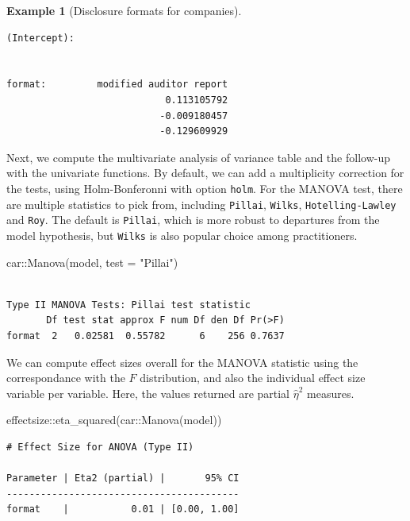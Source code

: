 \documentclass[
  11pt,
  letterpaper,
]{scrbook}
\newenvironment{Shaded}{\begin{snugshade}}{\end{snugshade}}
\newcommand{\AttributeTok}[1]{\textcolor[rgb]{0.40,0.45,0.13}{#1}}
\newcommand{\FunctionTok}[1]{\textcolor[rgb]{0.28,0.35,0.67}{#1}}
\newcommand{\NormalTok}[1]{\textcolor[rgb]{0.00,0.23,0.31}{#1}}
\newcommand{\SpecialCharTok}[1]{\textcolor[rgb]{0.37,0.37,0.37}{#1}}
\newcommand{\StringTok}[1]{\textcolor[rgb]{0.13,0.47,0.30}{#1}}
\theoremstyle{definition}
\theoremstyle{definition}
\newtheorem{example}{Example}[chapter]
\theoremstyle{remark}
\begin{document}
\begin{example}[Disclosure formats for
companies]
\begin{verbatim}
(Intercept):                           
                                       
                                       
format:         modified auditor report
                            0.113105792
                           -0.009180457
                           -0.129609929
\end{verbatim}

Next, we compute the multivariate analysis of variance table and the
follow-up with the univariate functions. By default, we can add a
multiplicity correction for the tests, using Holm-Bonferonni with option
\texttt{\textquotesingle{}holm\textquotesingle{}}. For the MANOVA test,
there are multiple statistics to pick from, including \texttt{Pillai},
\texttt{Wilks}, \texttt{Hotelling-Lawley} and \texttt{Roy}. The default
is \texttt{Pillai}, which is more robust to departures from the model
hypothesis, but \texttt{Wilks} is also popular choice among
practitioners.

\begin{Shaded}
\begin{Highlighting}[]
\NormalTok{car}\SpecialCharTok{::}\FunctionTok{Manova}\NormalTok{(model, }\AttributeTok{test =} \StringTok{"Pillai"}\NormalTok{)}
\end{Highlighting}
\end{Shaded}

\begin{verbatim}

Type II MANOVA Tests: Pillai test statistic
       Df test stat approx F num Df den Df Pr(>F)
format  2   0.02581  0.55782      6    256 0.7637
\end{verbatim}

We can compute effect sizes overall for the MANOVA statistic using the
correspondance with the \(F\) distribution, and also the individual
effect size variable per variable. Here, the values returned are partial
\(\widehat{\eta}^2\) measures.

\begin{Shaded}
\begin{Highlighting}[]
\NormalTok{effectsize}\SpecialCharTok{::}\FunctionTok{eta\_squared}\NormalTok{(car}\SpecialCharTok{::}\FunctionTok{Manova}\NormalTok{(model))}
\end{Highlighting}
\end{Shaded}

\begin{verbatim}
# Effect Size for ANOVA (Type II)

Parameter | Eta2 (partial) |       95% CI
-----------------------------------------
format    |           0.01 | [0.00, 1.00]


\end{verbatim}
\end{example}
\end{document}
